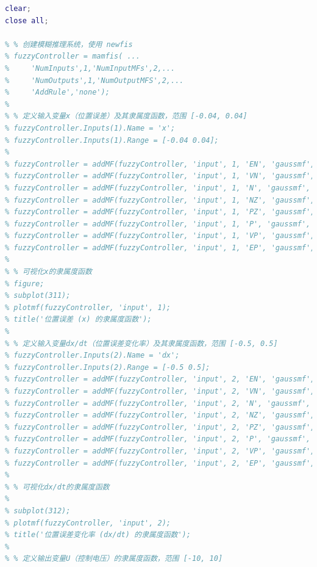 \documentclass[12pt,a4paper,UTF8]{article}
\begin{document}
\begin{lstlisting}[language=Matlab,caption=fis.m]
clear;
close all;

% % 创建模糊推理系统，使用 newfis
% fuzzyController = mamfis( ...
%     'NumInputs',1,'NumInputMFs',2,...
%     'NumOutputs',1,'NumOutputMFS',2,...
%     'AddRule','none');
% 
% % 定义输入变量x（位置误差）及其隶属度函数，范围 [-0.04, 0.04]
% fuzzyController.Inputs(1).Name = 'x';
% fuzzyController.Inputs(1).Range = [-0.04 0.04];
% 
% fuzzyController = addMF(fuzzyController, 'input', 1, 'EN', 'gaussmf', [0.01 -0.04]); % EN: Extremely Negative
% fuzzyController = addMF(fuzzyController, 'input', 1, 'VN', 'gaussmf', [0.01 -0.03]); % VN: Very Negative
% fuzzyController = addMF(fuzzyController, 'input', 1, 'N', 'gaussmf', [0.01 -0.02]);  % N: Negative
% fuzzyController = addMF(fuzzyController, 'input', 1, 'NZ', 'gaussmf', [0.01 -0.01]); % Z: Zero
% fuzzyController = addMF(fuzzyController, 'input', 1, 'PZ', 'gaussmf', [0.01 0.01]);  % Z: Zero
% fuzzyController = addMF(fuzzyController, 'input', 1, 'P', 'gaussmf', [0.01 0.02]);   % P: Positive
% fuzzyController = addMF(fuzzyController, 'input', 1, 'VP', 'gaussmf', [0.01 0.03]);  % VP: Very Positive
% fuzzyController = addMF(fuzzyController, 'input', 1, 'EP', 'gaussmf', [0.01 0.04]);  % EP: Extremely Positive
% 
% % 可视化x的隶属度函数
% figure;
% subplot(311);
% plotmf(fuzzyController, 'input', 1);
% title('位置误差 (x) 的隶属度函数');
% 
% % 定义输入变量dx/dt（位置误差变化率）及其隶属度函数，范围 [-0.5, 0.5]
% fuzzyController.Inputs(2).Name = 'dx';
% fuzzyController.Inputs(2).Range = [-0.5 0.5];
% fuzzyController = addMF(fuzzyController, 'input', 2, 'EN', 'gaussmf', [0.1 -0.5]);  % EN: Extremely Negative
% fuzzyController = addMF(fuzzyController, 'input', 2, 'VN', 'gaussmf', [0.1 -0.4]);  % VN: Very Negative
% fuzzyController = addMF(fuzzyController, 'input', 2, 'N', 'gaussmf', [0.1 -0.3]);  % N: Negative
% fuzzyController = addMF(fuzzyController, 'input', 2, 'NZ', 'gaussmf', [0.1 -0.1]);     % Z: Zero
% fuzzyController = addMF(fuzzyController, 'input', 2, 'PZ', 'gaussmf', [0.1 0.1]);     % Z: Zero
% fuzzyController = addMF(fuzzyController, 'input', 2, 'P', 'gaussmf', [0.1 0.3]);   % P: Positive
% fuzzyController = addMF(fuzzyController, 'input', 2, 'VP', 'gaussmf', [0.1 0.4]);   % VP: Very Positive
% fuzzyController = addMF(fuzzyController, 'input', 2, 'EP', 'gaussmf', [0.1 0.5]);   % EP: Extremely Positive
% 
% % 可视化dx/dt的隶属度函数
% 
% subplot(312);
% plotmf(fuzzyController, 'input', 2);
% title('位置误差变化率 (dx/dt) 的隶属度函数');
% 
% % 定义输出变量U（控制电压）的隶属度函数，范围 [-10, 10]

\end{lstlisting}
\end{document}
